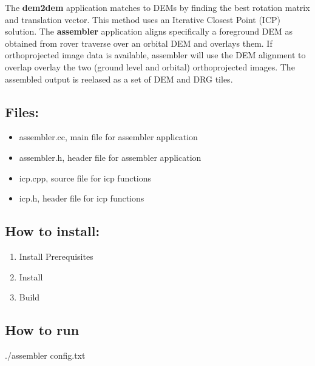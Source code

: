 The {\bf dem2dem} application matches to DEMs by finding the best rotation matrix and translation vector. This method uses an Iterative Closest Point (ICP) solution.
The {\bf assembler} application aligns specifically a foreground DEM as obtained from rover traverse over an orbital DEM and overlays them. If orthoprojected image data is available, 
assembler will use the DEM alignment to overlap overlay the two (ground level and orbital) orthoprojected images. The assembled output is reelased as a set of DEM and DRG tiles. 

\subsection{Files:}
\begin{itemize}
\item{assembler.cc, main file for assembler application}
\item{assembler.h, header file for assembler application}
\item{icp.cpp, source file for icp functions}
\item{icp.h, header file for icp functions}
\end{itemize}

\subsection{How to install:}
\begin{enumerate}
	\item{Install Prerequisites} 
	\item{Install} 
	\item{Build} 
\end{enumerate}

\subsection{How to run}
./assembler config.txt

